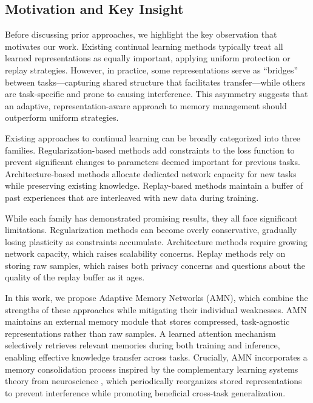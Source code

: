 \documentclass[11pt]{article}
\begin{document}
\subsection{Motivation and Key Insight}

Before discussing prior approaches, we highlight the key observation that motivates our work. Existing continual learning methods typically treat all learned representations as equally important, applying uniform protection or replay strategies. However, in practice, some representations serve as ``bridges'' between tasks---capturing shared structure that facilitates transfer---while others are task-specific and prone to causing interference. This asymmetry suggests that an adaptive, representation-aware approach to memory management should outperform uniform strategies.

Existing approaches to continual learning can be broadly categorized into three families. Regularization-based methods \citep{kirkpatrick2017overcoming, zenke2017continual, aljundi2018memory} add constraints to the loss function to prevent significant changes to parameters deemed important for previous tasks. Architecture-based methods \citep{rusu2016progressive, yoon2018lifelong, li2019learn} allocate dedicated network capacity for new tasks while preserving existing knowledge. Replay-based methods \citep{rebuffi2017icarl, shin2017continual, rolnick2019experience} maintain a buffer of past experiences that are interleaved with new data during training.

While each family has demonstrated promising results, they all face significant limitations. Regularization methods can become overly conservative, gradually losing plasticity as constraints accumulate. Architecture methods require growing network capacity, which raises scalability concerns. Replay methods rely on storing raw samples, which raises both privacy concerns and questions about the quality of the replay buffer as it ages.

In this work, we propose Adaptive Memory Networks (AMN), which combine the strengths of these approaches while mitigating their individual weaknesses. AMN maintains an external memory module that stores compressed, task-agnostic representations rather than raw samples. A learned attention mechanism selectively retrieves relevant memories during both training and inference, enabling effective knowledge transfer across tasks. Crucially, AMN incorporates a memory consolidation process inspired by the complementary learning systems theory from neuroscience \citep{mcclelland1995there, kumaran2016learning}, which periodically reorganizes stored representations to prevent interference while promoting beneficial cross-task generalization.
\end{document}

